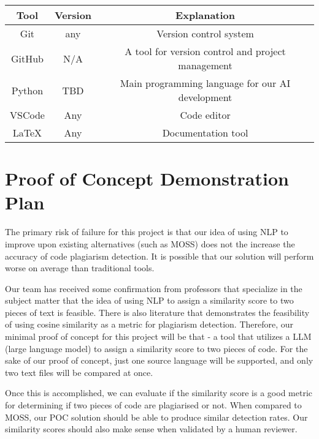 \documentclass{article}
\begin{document}
\begin{tabular}{|c|c|c|}
\hline
Tool   & Version & Explanation                                          \\
\hline
Git   & any  & Version control system                                   \\
\hline
GitHub & N/A     & A tool for version control and project management    \\
\hline
Python & TBD     & Main programming language for our AI development     \\
\hline
VSCode & Any     & Code editor                                          \\
\hline              
LaTeX  & Any     & Documentation tool                                   \\
\hline
\end{tabular}

\section{Proof of Concept Demonstration Plan}


The primary risk of failure for this project is that our idea of using NLP to improve upon existing alternatives (such as MOSS) does not the increase the accuracy of code plagiarism detection. It is possible that our solution will perform worse on average than traditional tools.

Our team has received some confirmation from professors that specialize in the subject matter that the idea of using NLP to assign a similarity score to two pieces of text is feasible. There is also literature that demonstrates the feasibility of using cosine similarity as a metric for plagiarism detection. Therefore, our minimal proof of concept for this project will be that - a tool that utilizes a LLM (large language model) to assign a similarity score to two pieces of code. For the sake of our proof of concept, just one source language will be supported, and only two text files will be compared at once.

Once this is accomplished, we can evaluate if the similarity score is a good metric for determining if two pieces of code are plagiarised or not. When compared to MOSS, our POC solution should be able to produce similar detection rates. Our similarity scores should also make sense when validated by a human reviewer.
\end{document}
